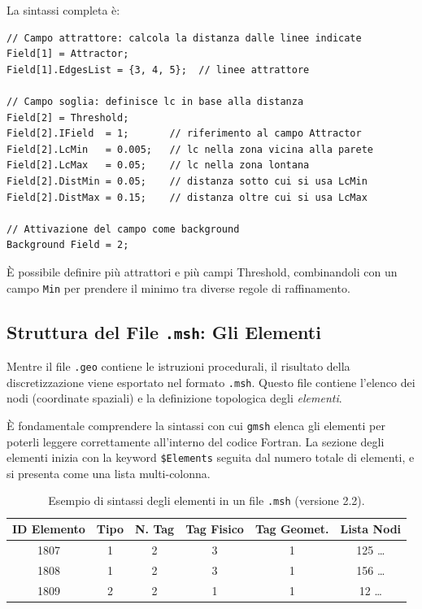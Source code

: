 La sintassi completa è:
\begin{lstlisting}[style=gmsh, caption={Definizione di Attractor e Threshold in \texttt{gmsh}.}]
// Campo attrattore: calcola la distanza dalle linee indicate
Field[1] = Attractor;
Field[1].EdgesList = {3, 4, 5};  // linee attrattore

// Campo soglia: definisce lc in base alla distanza
Field[2] = Threshold;
Field[2].IField  = 1;       // riferimento al campo Attractor
Field[2].LcMin   = 0.005;   // lc nella zona vicina alla parete
Field[2].LcMax   = 0.05;    // lc nella zona lontana
Field[2].DistMin = 0.05;    // distanza sotto cui si usa LcMin
Field[2].DistMax = 0.15;    // distanza oltre cui si usa LcMax

// Attivazione del campo come background
Background Field = 2;
\end{lstlisting}

È possibile definire più attrattori e più campi Threshold, combinandoli con un campo
\texttt{Min} per prendere il minimo tra diverse regole di raffinamento.

\subsection{Struttura del File \texttt{.msh}: Gli Elementi}

Mentre il file \texttt{.geo} contiene le istruzioni procedurali, il risultato della discretizzazione viene esportato nel formato \texttt{.msh}. Questo file contiene l'elenco dei nodi (coordinate spaziali) e la definizione topologica degli \emph{elementi}. 

È fondamentale comprendere la sintassi con cui \texttt{gmsh} elenca gli elementi per poterli leggere correttamente all'interno del codice Fortran. La sezione degli elementi inizia con la keyword \texttt{\$Elements} seguita dal numero totale di elementi, e si presenta come una lista multi-colonna.

\begin{table}[H]
  \centering
  \caption{Esempio di sintassi degli elementi in un file \texttt{.msh} (versione 2.2).}
  \label{tab:msh_elements}
  \begin{tabular}{cccccc}
    \toprule
    ID Elemento & Tipo & N. Tag & Tag Fisico & Tag Geomet. & Lista Nodi \\
    \midrule
    1807 & 1 & 2 & 3 & 1 & 125 \dots \\
    1808 & 1 & 2 & 3 & 1 & 156 \dots \\
    1809 & 2 & 2 & 1 & 1 & 12 \dots \\
    \bottomrule
  \end{tabular}
\end{table}

